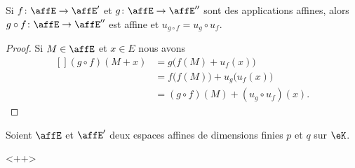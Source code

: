 \begin{proposition}
    Si \( f\colon \affE\to \affE'\) et \( g\colon \affE\to \affE''\) sont des applications affines, alors \( g\circ f\colon \affE\to \affE''\) est affine et \( u_{g\circ f}=u_g\circ u_f\).
\end{proposition}

\begin{proof}
    Si \( M\in\affE\) et \( x\in E\) nous avons
    \begin{equation}
        \begin{aligned}[]
            (g\circ f)(M+x)&=g\big( f(M)+u_f(x) \big)\\
            &=f\big( f(M) \big)+u_g\big( u_f(x) \big)\\
            &=(g\circ f)(M)+(u_g\circ u_f)(x).
        \end{aligned}
    \end{equation}
\end{proof}

\begin{theorem}
    Soient \( \affE\) et \( \affE'\) deux espaces affines de dimensions finies \( p\) et \( q\) sur \( \eK\).
\end{theorem}
<++>

